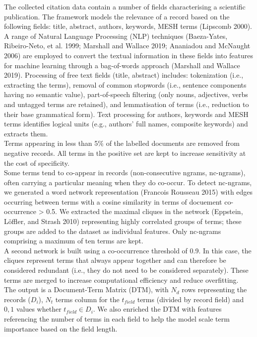 \documentclass{article}
\begin{document}
The collected citation data contain a number of fields characterising a
scientific publication. The framework models the relevance of a record
based on the following fields: title, abstract, authors, keywords, MESH
terms (Lipscomb 2000). A range of Natural Language Processing (NLP)
techniques (Baeza-Yates, Ribeiro-Neto, et al. 1999; Marshall and Wallace
2019; Ananiadou and McNaught 2006) are employed to convert the textual
information in these fields into features for machine learning through a
bag-of-words approach (Marshall and Wallace 2019). Processing of free
text fields (title, abstract) includes: tokenization (i.e., extracting
the terms), removal of common stopwords (i.e., sentence components
having no semantic value), part-of-speech filtering (only nouns,
adjectives, verbs and untagged terms are retained), and lemmatisation of
terms (i.e., reduction to their base grammatical form). Text processing
for authors, keywords and MESH terms identifies logical units (e.g.,
authors' full names, composite keywords) and extracts them.\\
Terms appearing in less than 5\% of the labelled documents are removed
from negative records. All terms in the positive set are kept to
increase sensitivity at the cost of specificity.\\
Some terms tend to co-appear in records (non-consecutive ngrams,
nc-ngrams), often carrying a particular meaning when they do co-occur.
To detect nc-ngrams, we generated a word network representation
(Francois Rousseau 2015) with edges occurring between terms with a
cosine similarity in terms of docuement co-occurrence \textgreater{}
0.5. We extracted the maximal cliques in the network (Eppstein, Löffler,
and Strash 2010) representing highly correlated groups of terms; these
groups are added to the dataset as individual features. Only nc-ngrams
comprising a maximum of ten terms are kept.\\
A second network is built using a co-occurrence threshold of 0.9. In
this case, the cliques represent terms that always appear together and
can therefore be considered redundant (i.e., they do not need to be
considered separately). These terms are merged to increase computational
efficiency and reduce overfitting.\\
The output is a Document-Term Matrix (DTM), with \(N_d\) rows
representing the records (\(D_i\)), \(N_t\) terms column for the
\(t_{field}\) terms (divided by record field) and \({0,1}\) values
whether \(t_{field} \in D_i\). We also enriched the DTM with features
referencing the number of terms in each field to help the model scale
term importance based on the field length.
\end{document}
